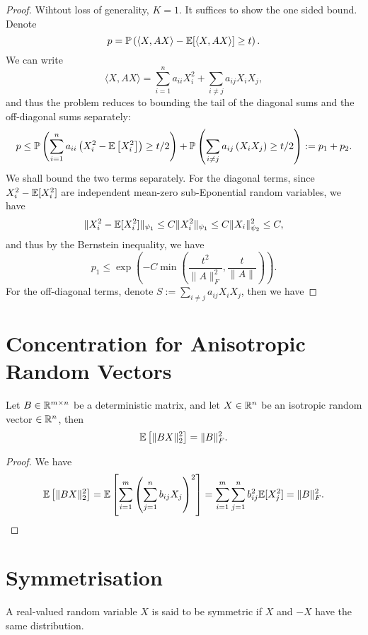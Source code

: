 \begin{proof}
	Wihtout loss of generality, \(K=1\). It suffices to show the one sided bound. Denote
	\begin{equation*}
		p=\mathbb{P}\left(\langle X, AX\rangle-\mathbb{E}[\langle X, AX\rangle]\geq t\right).
	\end{equation*}
	We can write
	\begin{equation*}
		\langle X, AX\rangle=\sum_{i=1}^{n}a_{ii}X_{i}^{2}+\sum_{i\neq j}a_{ij}X_{i}X_{j},
	\end{equation*}
	and thus the problem reduces to bounding the tail of the diagonal sums and the off-diagonal sums separately:
	\begin{equation*}
		p\leq\mathbb{P}\left(\sum_{i=1}^{n}a_{ii}\left(X_{i}^{2}-\mathbb{E}\left[X_{i}^{2}\right]\right)\geq t/2\right)+\mathbb{P}\left(\sum_{i\neq j}a_{ij}\left(X_{i}X_{j}\right)\geq t/2\right):=p_{1}+p_{2}.
	\end{equation*}
	We shall bound the two terms separately. For the diagonal terms, since \(X_i^2-\mathbb{E}[X_i^2]\) are independent mean-zero sub-Eponential random variables, we have
	\begin{equation*}
		\|X_{i}^{2}-\mathbb{E}[X_{i}^{2}]\|_{\psi_{1}}\leq C\|X_{i}^{2}\|_{\psi_{1}}\leq C\|X_{i}\|_{\psi_{2}}^{2}\leq C,
	\end{equation*}
	and thus by the Bernstein inequality, we have
	\begin{equation*}
		p_{1}\leq\exp\left(-C\min\left(\frac{t^{2}}{\|A\|_{F}^{2}}, \frac{t}{\|A\|}\right)\right).
	\end{equation*}
	For the off-diagonal terms, denote \(S:=\sum_{i\neq j}a_{ij}X_{i}X_{j}\), then we have
\end{proof}

\section{Concentration for Anisotropic Random Vectors}

\begin{lemma}
	Let \(B\in\mathbb{R}^{m\times n}\) be a deterministic matrix, and let \(X\in\mathbb{R}^{n}\) be an isotropic random vector \(\in\mathbb{R}^{n}\), then
	\begin{equation*}
		\mathbb{E}\left[\|BX\|_{2}^{2}\right]=\|B\|_{F}^{2}.
	\end{equation*}
\end{lemma}

\begin{proof}
	We have
	\begin{equation*}
		\mathbb{E}\left[\|BX\|_{2}^{2}\right]=\mathbb{E}\left[\sum_{i=1}^{m}\left(\sum_{j=1}^{n}b_{ij}X_{j}\right)^{2}\right]=\sum_{i=1}^{m}\sum_{j=1}^{n}b_{ij}^{2}\mathbb{E}[X_{j}^{2}]=\|B\|_{F}^{2}.
	\end{equation*}
\end{proof}

\section{Symmetrisation}

\begin{definition}
	A real-valued random variable \(X\) is said to be symmetric if \(X\) and \(-X\) have the same distribution.
\end{definition}
